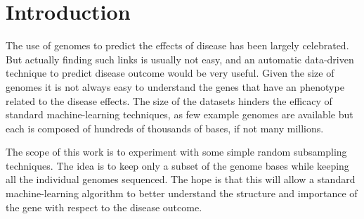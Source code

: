 \section{Introduction}
\label{sec:intro}
The use of genomes to predict the effects of disease has been largely celebrated.
But actually finding such links is usually not easy, and an automatic data-driven technique to predict disease outcome would be very useful.
Given the size of genomes it is not always easy to understand the genes that have an phenotype related to the disease effects.
The size of the datasets hinders the efficacy of standard machine-learning techniques, as few example genomes are available but each is composed of hundreds of thousands of bases, if not many millions.


The scope of this work is to experiment with some simple random subsampling techniques. The idea is to keep only a subset of the genome bases while keeping all the individual genomes sequenced.
The hope is that this will allow a standard machine-learning algorithm to better understand the structure and importance of the gene with respect to the disease outcome.

